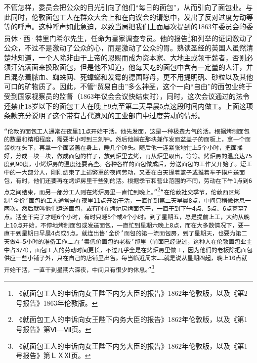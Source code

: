 \documentclass{ctexbook}
\begin{document}
    不管怎样，委员会把公众的目光引向了他们“每日的面包”，从而引向了面包业。与此同时，伦敦面包工人在群众大会上和在向议会的请愿中，发出了反对过度劳动等等的呼声。这种呼声如此急迫，以致当局把我们上面屡次提到的1863年委员会的委员休·西·特里门希尔先生，任命为皇家调查专员。他的报告\footnote{《就面包工人的申诉向女王陛下内务大臣的报告》1862年伦敦版，以及《第2号报告》1863年伦敦版。}和列举的证词激动了公众，不过不是激动了公众的心，而是激动了公众的胃。熟读圣经的英国人虽然清楚地知道，一个人除非由于上帝的恩赐而成为资本家、大地主或领干薪者，否则必须汗流满面来换取面包，但是他不知道，他每天吃的面包中含有一定量的人汗，并且混杂着脓血、蜘蛛网、死蟑螂和发霉的德国酵母，更不用提明矾、砂粒以及其他可口的矿物质了。因此，不管“贸易自由”多么神圣，这个一向“自由”的面包业终于受到国家视察员的监督（1863年议会会议快结束时），同时，这次会议通过的法令还禁止18岁以下的面包工人在晚上9点至第二天早晨5点这段时间内做工。上面这项条款充分说明了这个带有古代遗风的工业部门中过度劳动的情形。

    \texttt{“伦敦的面包工人通常在夜里11点开始干活。他先发面，这是一种极费力气的活。根据烤制面包的数量和精粗程度，需要半小时到三刻钟。然后他躺在那块兼作发面盆盖子的面板上，拿一个面袋枕在头下，再拿一个面袋盖在身上，睡几个钟头。随后他一连紧张地忙上5个小时，把面揉好，分成一块一块，做成面包的样子，放到炉里去烤，再从炉里取出，等等。烤炉房的温度达75度到90度，小烤炉房的温度还要高些。各种各样的面包做成后，分送面包的工作又开始了。短工中的一大部分人，刚刚结束了上述繁重的夜间劳动，又要在白天提着篮子或推着车子挨户送面包，有时，他们还要再在烤炉房里干些别的活。根据季节和营业范围的不同，劳动在下午1点到6点之间结束，而另一部分工人则在烤炉房里一直忙到晚上。”}\footnote{《就面包工人的申诉向女王陛下内务大臣的报告》1862年伦敦版，以及《第1号报告》第Ⅵ—Ⅶ页。}\texttt{“在伦敦社交季节，伦敦西区烤制‘全价’面包的工人通常是在夜里11点开始干活，一直忙到第二天早晨8点，中间只稍微休息一两次。然后就叫他们运送面包，或有时在烤炉房烤面包干，一直干到下午4点、5点、6点甚至7点。活全干完了才睡6个小时，有时只睡5个或4个小时。到了星期五，总是提前上工，大约从晚上10点开始，不停地烤制面包或发送面包，一直忙到星期六晚上8点，而在大多数情况下，要一直干到星期日早晨4点或5点。就连出售‘全价’面包的第一流面包房，到了星期天，也要为第二天做4—5小时的准备工作……在‘卖低价面包的老板’那里（前面已经说过，这种人在伦敦面包业主中占3/4），面包工人的劳动时间更长，不过几乎全是在烤炉房里做工，因为他们的老板除把面包供应一些小铺子外，只在自己的店铺里出售。每当临近周末……就是说从星期四起，晚上10点就开始干活，一直干到星期六深夜，中间只有很少的休息。”}\footnote{《就面包工人的申诉向女王陛下内务大臣的报告》1862年伦敦版，以及《第1号报告》第ＬＸⅪ页。}
\end{document}
